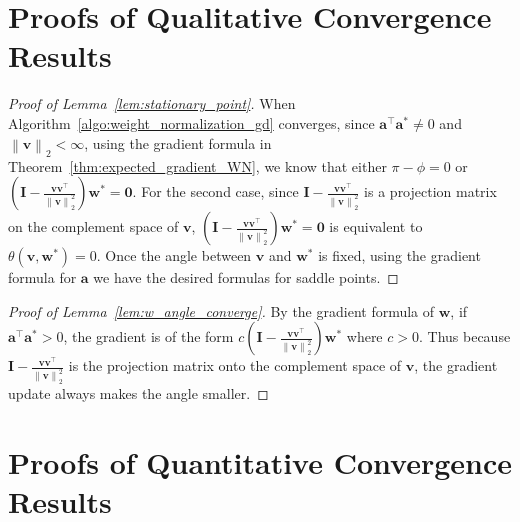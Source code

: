 \documentclass{article}
\newcommand{\firstlayer}{w}
\newcommand{\firstlayerWN}{v}
\newcommand{\secondlayer}{a}
\newcommand{\mat}[1]{\mathbf{#1}}
\newcommand{\vect}[1]{\mathbf{#1}}
\newcommand{\norm}[1]{\left\|#1\right\|}
\begin{document}
\section{Proofs of Qualitative Convergence Results}
\label{sec:proof_qualitative}
\begin{proof}[Proof of Lemma~\ref{lem:stationary_point}]
When Algorithm~\ref{algo:weight_normalization_gd} converges, since $\vect{\secondlayer}^\top \vect{\secondlayer}^* \neq 0$ and $\norm{\vect{\firstlayerWN}}_2 < \infty$, using the gradient formula in Theorem~\ref{thm:expected_gradient_WN}, we know that either $\pi-\phi = 0$ or
$\left(\mat{I} -\frac{\vect{\firstlayerWN}\vect{\firstlayerWN}^\top}{\norm{\vect{\firstlayerWN}}_2^2}\right)\vect{\firstlayer}^*=\vect{0}.$
For the second case, since $\mat{I} -\frac{\vect{\firstlayerWN}\vect{\firstlayerWN}^\top}{\norm{\vect{\firstlayerWN}}_2^2}$ is a projection matrix on the complement space of $\vect{\firstlayerWN}$, $\left(\mat{I} -\frac{\vect{\firstlayerWN}\vect{\firstlayerWN}^\top}{\norm{\vect{\firstlayerWN}}_2^2}\right)\vect{\firstlayer}^*=\vect{0}$ is equivalent to $\theta\left(\vect{\firstlayerWN},\vect{\firstlayer}^*\right)=0$.
Once the angle between $\vect{\firstlayerWN}$ and $\vect{\firstlayer}^*$ is fixed, using the gradient formula for $\vect{\secondlayer}$ we have the desired formulas for saddle points.
\end{proof}\begin{proof}[Proof of Lemma~\ref{lem:w_angle_converge}]
By the gradient formula of $\vect{w}$, if $\vect{\secondlayer}^\top \vect{\secondlayer}^* > 0$, the gradient is of the form $c\left(\mat{I} -\frac{\vect{\firstlayerWN}\vect{\firstlayerWN}^\top}{\norm{\vect{\firstlayerWN}}_2^2}\right)\vect{w}^*$ where $c > 0$.
Thus because $\mat{I} -\frac{\vect{\firstlayerWN}\vect{\firstlayerWN}^\top}{\norm{\vect{\firstlayerWN}}_2^2}$ is the projection matrix onto the complement space of $\vect{\firstlayerWN}$, the gradient update always makes the angle smaller.
\end{proof}

\section{Proofs of Quantitative Convergence Results}
\label{sec:proof_dynamics}
\end{document}
